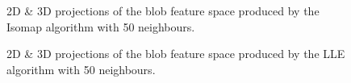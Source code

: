 \begin{figure}[H]
	\centering
	\caption{2D \& 3D projections of the blob feature space  produced by the Isomap algorithm with 50 neighbours.}\label{fig:blob_iso_mapping}
\end{figure}

\begin{figure}[H]
	\centering
	\caption{2D \& 3D projections of the blob feature space produced by the LLE algorithm with 50 neighbours.}\label{fig:blob_LLE_mapping}
\end{figure}

